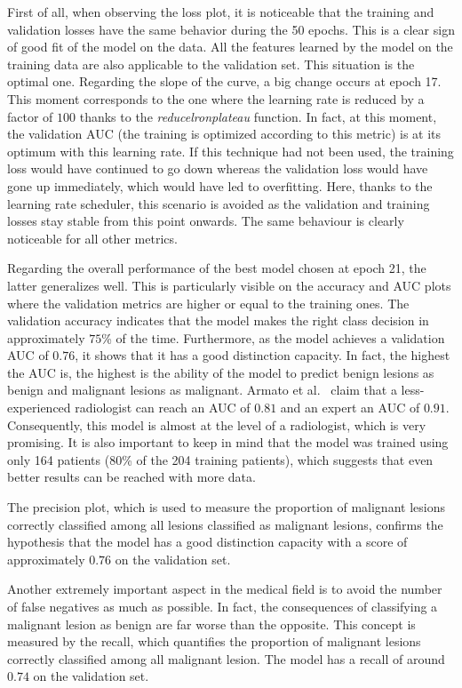 First of all, when observing the loss plot, it is noticeable that the training and validation losses have the same behavior during the 50 epochs. This is a clear sign of good fit of the model on the data. All the features learned by the model on the training data are also applicable to the validation set. This situation is the optimal one. Regarding the slope of the curve, a big change occurs at epoch 17. This moment corresponds to the one where the learning rate is reduced by a factor of $100$ thanks to the \textit{reducelronplateau} function. In fact, at this moment, the validation AUC (the training is optimized according to this metric) is at its optimum with this learning rate. If this technique had not been used, the training loss would have continued to go down whereas the validation loss would have gone up immediately, which would have led to overfitting. Here, thanks to the learning rate scheduler, this scenario is avoided as the validation and training losses stay stable from this point onwards. The same behaviour is clearly noticeable for all other metrics.

Regarding the overall performance of the best model chosen at epoch 21, the latter generalizes well. This is particularly visible on the accuracy and AUC plots where the validation metrics are higher or equal to the training ones. The validation accuracy indicates that the model makes the right class decision in approximately $75$\% of the time. Furthermore, as the model achieves a validation AUC of $0.76$, it shows that it has a good distinction capacity. In fact, the highest the AUC is, the highest is the ability of the model to predict benign lesions as benign and malignant lesions as malignant. Armato et al.~\cite{42} claim that a less-experienced radiologist can reach an AUC of $0.81$ and an expert an AUC of $0.91$. Consequently, this model is almost at the level of a radiologist, which is very promising. It is also important to keep in mind that the model was trained using only 164 patients (80\% of the 204 training patients), which suggests that even better results can be reached with more data.

The precision plot, which is used to measure the proportion of malignant lesions correctly classified among all lesions classified as malignant lesions, confirms the hypothesis that the model has a good distinction capacity with a score of approximately $0.76$ on the validation set.

\noindent Another extremely important aspect in the medical field is to avoid the number of false negatives as much as possible. In fact, the consequences of classifying a malignant lesion as benign are far worse than the opposite. This concept is measured by the recall, which quantifies the proportion of malignant lesions correctly classified among all malignant lesion. The model has a recall of around $0.74$ on the validation set.

